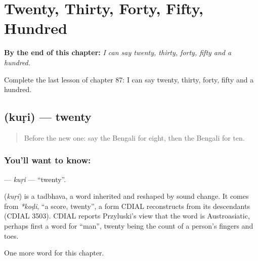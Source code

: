 
\chapter{Twenty, Thirty, Forty, Fifty, Hundred}
\label{ch:bn-twenty-thirty-forty-fifty-hundred}

\begin{chapteropening}
\textbf{By the end of this chapter:} \emph{I can say twenty, thirty, forty, fifty and a hundred.}

Complete the last lesson of chapter 87: I can say twenty, thirty, forty, fifty and a hundred.
\end{chapteropening}

\section[\texorpdfstring{\bn{কুড়ি} (kuṛi)}{কুড়ি (kuṛi)}]{ (kuṛi) — twenty}

\label{lesson:BN-C87-kuri}



\begin{quote}
Before the new one: say the Bengali for eight, then the Bengali for ten.
\end{quote}

\subsection*{You'll want to know: }
\textbf{} — \emph{kuṛi} — \textquotedblleft{}twenty\textquotedblright{}.

\begin{cousinweb}
\textbf{} (\emph{kuṛi}) is a tadbhava, a word inherited and reshaped by sound change. It comes from \emph{*koḍi}, \textquotedblleft{}a score, twenty\textquotedblright{}, a form CDIAL reconstructs from its descendants (CDIAL 3503). CDIAL reports Przyluski's view that the word is Austroasiatic, perhaps first a word for \textquotedblleft{}man\textquotedblright{}, twenty being the count of a person's fingers and toes.
\end{cousinweb}

\begin{grammarlens}[title={What you've built}]
One more word for this chapter.
\end{grammarlens}

